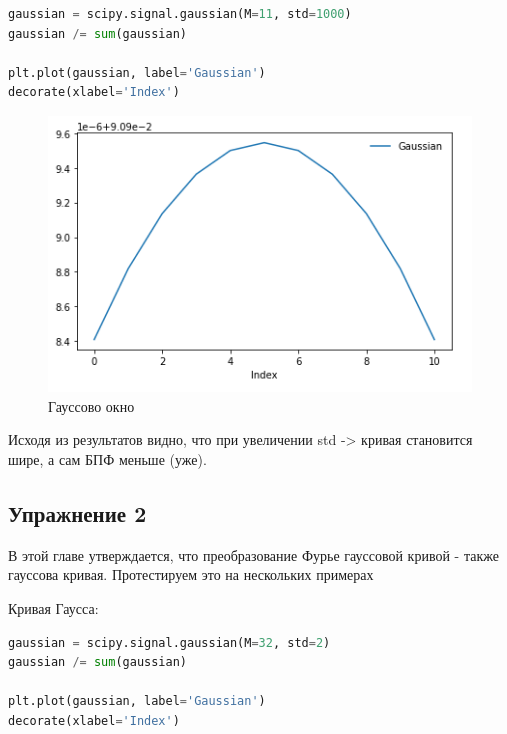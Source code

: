 \begin{lstlisting}[language=Python]
gaussian = scipy.signal.gaussian(M=11, std=1000)
gaussian /= sum(gaussian)

plt.plot(gaussian, label='Gaussian')
decorate(xlabel='Index')
\end{lstlisting}

\begin{figure}[H]
	\begin{center}
		\includegraphics[scale=0.7]{fig/lab08/lab08_03.png}
		\caption{Гауссово окно}
	\end{center}
\end{figure}

Исходя из результатов видно, что при увеличении std -> кривая становится шире, а сам БПФ меньше (уже).


\subsection{Упражнение 2}

В этой главе утверждается, что преобразование Фурье гауссовой кривой - также гауссова кривая. Протестируем это на нескольких примерах

Кривая Гаусса:

\begin{lstlisting}[language=Python]
gaussian = scipy.signal.gaussian(M=32, std=2)
gaussian /= sum(gaussian)

plt.plot(gaussian, label='Gaussian')
decorate(xlabel='Index')
\end{lstlisting}

